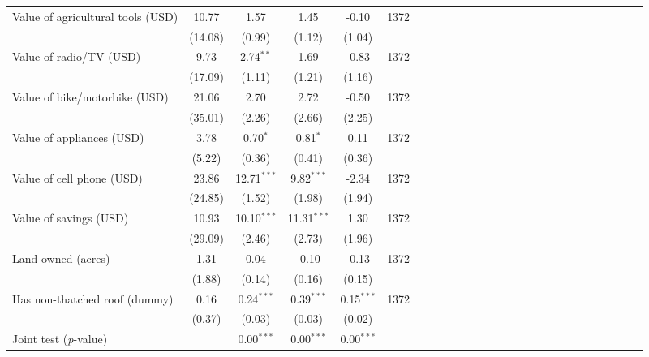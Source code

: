 {\begin{tabular}{l*{5}{SSSSc}}
\hspace{0.2cm}Value of agricultural tools (USD)&    10.77&     1.57&     1.45&    -0.10&     1372\\
          &  (14.08)&   (0.99)&   (1.12)&   (1.04)&         \\
\hspace{0.2cm}Value of radio/TV (USD)&     9.73&2.74$^{**}$&     1.69&    -0.83&     1372\\
          &  (17.09)&   (1.11)&   (1.21)&   (1.16)&         \\
\hspace{0.2cm}Value of bike/motorbike (USD)&    21.06&     2.70&     2.72&    -0.50&     1372\\
          &  (35.01)&   (2.26)&   (2.66)&   (2.25)&         \\
\hspace{0.2cm}Value of appliances (USD)&     3.78&0.70$^{*}$&0.81$^{*}$&     0.11&     1372\\
          &   (5.22)&   (0.36)&   (0.41)&   (0.36)&         \\
\hspace{0.2cm}Value of cell phone (USD)&    23.86&12.71$^{***}$&9.82$^{***}$&    -2.34&     1372\\
          &  (24.85)&   (1.52)&   (1.98)&   (1.94)&         \\
Value of savings (USD)&    10.93&10.10$^{***}$&11.31$^{***}$&     1.30&     1372\\
          &  (29.09)&   (2.46)&   (2.73)&   (1.96)&         \\
Land owned (acres)&     1.31&     0.04&    -0.10&    -0.13&     1372\\
          &   (1.88)&   (0.14)&   (0.16)&   (0.15)&         \\
Has non-thatched roof (dummy)&     0.16&0.24$^{***}$&0.39$^{***}$&0.15$^{***}$&     1372\\
          &   (0.37)&   (0.03)&   (0.03)&   (0.02)&         \\
\midrule Joint test (\emph{p}-value)&         &{0.00$^{***}$}&{0.00$^{***}$}&{0.00$^{***}$}&         \\
\bottomrule
\end{tabular}
}
